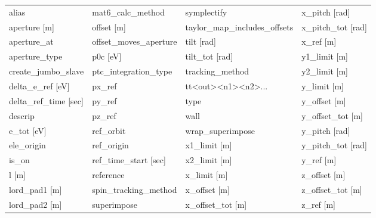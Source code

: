  \begin{tabular}{llll} \toprule
alias                            & mat6_calc_method                 & symplectify                      & x_pitch [rad]                    \\
aperture [m]                     & offset [m]                       & taylor_map_includes_offsets      & x_pitch_tot [rad]                \\
aperture_at                      & offset_moves_aperture            & tilt [rad]                       & x_ref [m]                        \\
aperture_type                    & p0c [eV]                         & tilt_tot [rad]                   & y1_limit [m]                     \\
create_jumbo_slave               & ptc_integration_type             & tracking_method                  & y2_limit [m]                     \\
delta_e_ref [eV]                 & px_ref                           & tt<out><n1><n2>...               & y_limit [m]                      \\
delta_ref_time [sec]             & py_ref                           & type                             & y_offset [m]                     \\
descrip                          & pz_ref                           & wall                             & y_offset_tot [m]                 \\
e_tot [eV]                       & ref_orbit                        & wrap_superimpose                 & y_pitch [rad]                    \\
ele_origin                       & ref_origin                       & x1_limit [m]                     & y_pitch_tot [rad]                \\
is_on                            & ref_time_start [sec]             & x2_limit [m]                     & y_ref [m]                        \\
l [m]                            & reference                        & x_limit [m]                      & z_offset [m]                     \\
lord_pad1 [m]                    & spin_tracking_method             & x_offset [m]                     & z_offset_tot [m]                 \\
lord_pad2 [m]                    & superimpose                      & x_offset_tot [m]                 & z_ref [m]                        \\
 \bottomrule
 \end{tabular}
 \vfill
 

